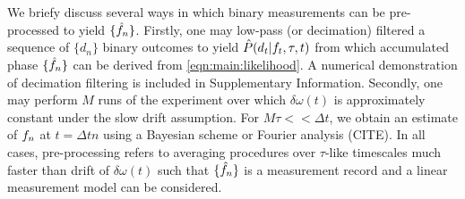 \\
\\
We briefy discuss several ways in which binary measurements can be pre-processed to yield $\{ \hat{f}_n\}$. Firstly, one may low-pass (or decimation) filtered a sequence of $\{ d_n\}$ binary outcomes to yield $\hat{P}(d_t | f_t, \tau, t)$ from which accumulated phase $\{ \hat{f}_n\}$ can be derived from \cref{eqn:main:likelihood}. A numerical demonstration of decimation filtering is included in Supplementary Information. Secondly, one may perform $M$ runs of the experiment over which $\delta \omega (t)$ is approximately constant under the slow drift assumption. For $M\tau << \Delta t$, we obtain an estimate of  $f_n$ at $t = \Delta t n$ using a Bayesian scheme or Fourier analysis (CITE). In all cases, pre-processing refers to averaging procedures over $\tau$-like timescales much faster than drift of $\delta \omega (t)$ such that $\{ \hat{f}_n\}$ is a measurement record and a linear measurement model can be considered. 


